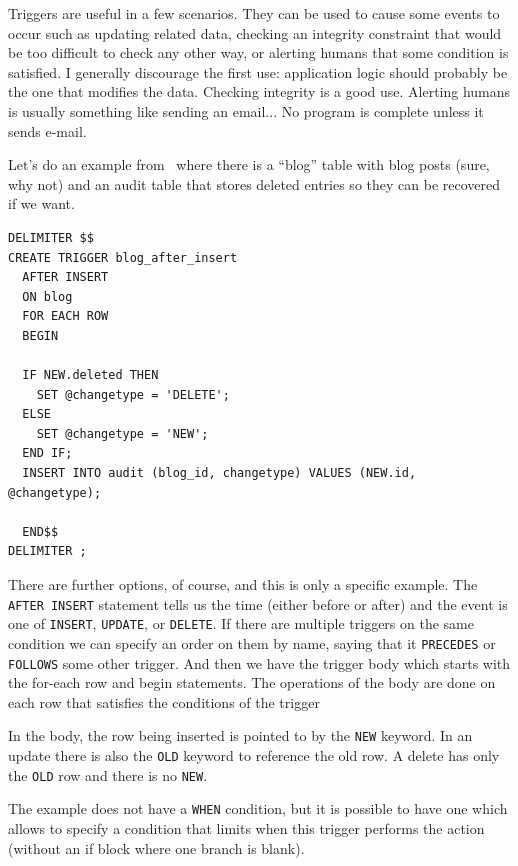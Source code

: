 Triggers are useful in a few scenarios. They can be used to cause some events to occur such as updating related data, checking an integrity constraint that would be too difficult to check any other way, or alerting humans that some condition is satisfied. I generally discourage the first use: application logic should probably be the one that modifies the data. Checking integrity is a good use. Alerting humans is usually something like sending an email... No program is complete unless it sends e-mail.

Let's do an example from~\cite{trigger} where there is a ``blog'' table with blog posts (sure, why not) and an audit table that stores deleted entries so they can be recovered if we want.

{\small
\begin{verbatim}
DELIMITER $$
CREATE TRIGGER blog_after_insert 
  AFTER INSERT 
  ON blog
  FOR EACH ROW 
  BEGIN
  
  IF NEW.deleted THEN
    SET @changetype = 'DELETE';
  ELSE
    SET @changetype = 'NEW';
  END IF;  
  INSERT INTO audit (blog_id, changetype) VALUES (NEW.id, @changetype);
		
  END$$
DELIMITER ;
\end{verbatim}
}

There are further options, of course, and this is only a specific example. The \texttt{AFTER INSERT} statement tells us the time (either before or after) and the event is one of \texttt{INSERT}, \texttt{UPDATE}, or \texttt{DELETE}. If there are multiple triggers on the same condition we can specify an order on them by name, saying that it \texttt{PRECEDES} or \texttt{FOLLOWS} some other trigger. And then we have the trigger body which starts with the for-each row and begin statements. The operations of the body are done on each row that satisfies the conditions of the trigger

In the body, the row being inserted is pointed to by the \texttt{NEW} keyword. In an update there is also the \texttt{OLD} keyword to reference the old row. A delete has only the \texttt{OLD} row and there is no \texttt{NEW}.

The example does not have a \texttt{WHEN} condition, but it is possible to have one which allows to specify a condition that limits when this trigger performs the action (without an if block where one branch is blank). 





